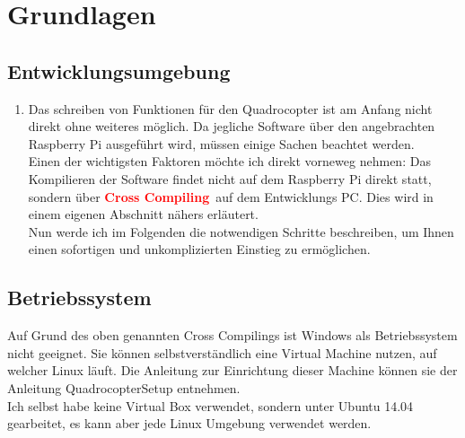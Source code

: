 \documentclass{article}
\begin{document}
\newpage
\section{Grundlagen}
\subsection{Entwicklungsumgebung}

\begin{enumerate}
\item[]Das schreiben von Funktionen für den Quadrocopter ist am Anfang nicht direkt ohne weiteres möglich. Da jegliche Software über den angebrachten Raspberry Pi ausgeführt wird, müssen einige Sachen beachtet werden.\\

Einen der wichtigsten Faktoren möchte ich direkt vorneweg nehmen: Das Kompilieren der Software findet nicht auf dem Raspberry Pi direkt statt, sondern über \textcolor{red}{\textbf{Cross Compiling}}\ auf dem Entwicklungs PC. Dies wird in einem eigenen Abschnitt nähers erläutert.\\

Nun werde ich im Folgenden die notwendigen Schritte beschreiben, um Ihnen einen sofortigen und unkomplizierten Einstieg zu ermöglichen.\\

\end{enumerate}
\subsection{Betriebssystem}
Auf Grund des oben genannten Cross Compilings ist Windows als Betriebssystem nicht geeignet. Sie können selbstverständlich eine Virtual Machine nutzen, auf welcher Linux läuft. Die Anleitung zur Einrichtung dieser Machine können sie der Anleitung QuadrocopterSetup entnehmen.\\
Ich selbst habe keine Virtual Box verwendet, sondern unter Ubuntu 14.04 gearbeitet, es kann aber jede Linux Umgebung verwendet werden.\\
\end{document}
